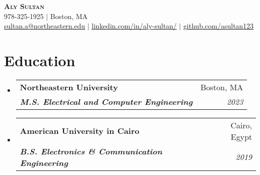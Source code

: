 \documentclass[letterpaper,11pt]{article}
\makeatletter
\newcommand{\resumeSubheading}[4]{
  \vspace{-2pt}\item
    \begin{tabular*}{0.97\textwidth}[t]{l@{\extracolsep{\fill}}r}
      \textbf{#1} & #2 \\
      \textit{\textbf{\small#3}} & \textit{\small #4} \\
    \end{tabular*}\vspace{-7pt}
}
\newcommand{\resumeSubHeadingListStart}{\begin{itemize}[leftmargin=0.15in, label={}]}
\newcommand{\resumeSubHeadingListEnd}{\end{itemize}}
\makeatother
\begin{document}

\begin{center}
    \textbf{\Huge \scshape Aly Sultan} \\ \vspace{2pt}
    \small 978-325-1925 $|$ \small Boston, MA \\ \vspace{2pt}
    \href{mailto:sultan.a@northeastern.edu}{\underline{sultan.a@northeastern.edu}} $|$ 
    \href{https://linkedin.com/in/aly-sultan/}{\underline{linkedin.com/in/aly-sultan/}} $|$
    \href{https://github.com/asultan123}{\underline{github.com/asultan123}}
    
\end{center}


\section{Education}
  \resumeSubHeadingListStart
    \resumeSubheading
      {Northeastern University}{Boston, MA}
      {M.S. Electrical and Computer Engineering}{2023}
    \resumeSubheading
      {American University in Cairo}{Cairo, Egypt}
      {B.S. Electronics \& Communication Engineering}{2019}
  \resumeSubHeadingListEnd


\end{document}
